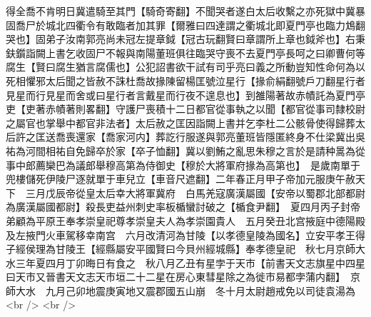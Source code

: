 得全喬不肯明日冀遣騎至其門【騎奇寄翻】不聞哭者遂白太后收繫之亦死獄中冀暴固喬尸於城北四衢令有敢臨者加其罪【爾雅曰四達謂之衢城北即夏門亭也臨力鴆翻哭也】固弟子汝南郭亮尚未冠左提章鉞【冠古玩翻賢曰章謂所上章也鉞斧也】右秉鈇鑕詣闕上書乞收固尸不報與南陽董班俱往臨哭守喪不去夏門亭長呵之曰卿曹何等腐生【賢曰腐生猶言腐儒也】公犯詔書欲干試有司乎亮曰義之所動豈知性命何為以死相懼邪太后聞之皆赦不誅杜喬故掾陳留楊匡號泣星行【掾俞絹翻號戶刀翻星行者見星而行見星而舍或曰星行者言戴星而行夜不遑息也】到雒陽著故赤幘託為夏門亭吏【吏著赤幘著則畧翻】守護尸喪積十二日都官從事執之以聞【都官從事司隸校尉之屬官也掌舉中都官非法者】太后赦之匡因詣闕上書并乞李杜二公骸骨使得歸葬太后許之匡送喬喪還家【喬家河内】葬訖行服遂與郭亮董班皆隱匿終身不仕梁冀出吳祐為河間相祐自免歸卒於家【卒子恤翻】冀以劉鮪之亂思朱穆之言於是請种暠為從事中郎薦欒巴為議郎舉穆高第為侍御史【穆於大將軍府掾為高第也】　是歲南單于兜樓儲死伊陵尸逐就單于車兒立【車音尺遮翻】二年春正月甲子帝加元服庚午赦天下　三月戊辰帝從皇太后幸大將軍冀府　白馬羌寇廣漢屬國【安帝以蜀郡北部都尉為廣漢屬國都尉】殺長吏益州刺史率板楯蠻討破之【楯食尹翻】　夏四月丙子封帝弟顧為平原王奉孝崇皇祀尊孝崇皇夫人為孝崇園貴人　五月癸丑北宫掖庭中德陽殿及左掖門火車駕移幸南宫　六月改清河為甘陵【以孝德皇陵為國名】立安平孝王得子經侯理為甘陵王【經縣屬安平國賢曰今貝州經城縣】奉孝德皇祀　秋七月京師大水三年夏四月丁卯晦日有食之　秋八月乙丑有星孛于天市【前書天文志旗星中四星曰天市又晉書天文志天市垣二十二星在房心東彗星除之為徙市易都孛蒲内翻】　京師大水　九月己卯地震庚寅地又震郡國五山崩　冬十月太尉趙戒免以司徒袁湯為<br />
<br />
